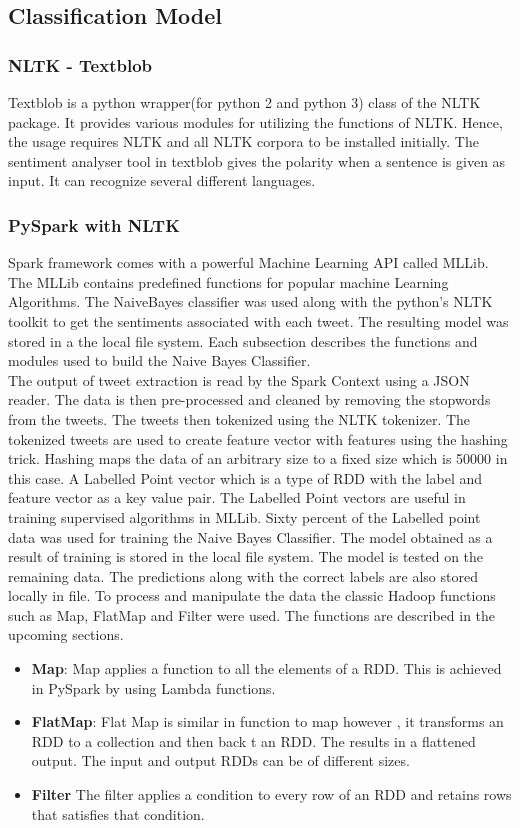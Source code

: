 \documentclass[9pt,twocolumn,twoside]{styles/osajnl}
\begin{document}
\subsection{Classification Model}
\subsubsection{NLTK - Textblob}
Textblob is a python wrapper(for python 2 and python 3) class of the NLTK package. It provides various modules for utilizing the functions of NLTK. Hence, the usage requires NLTK and all NLTK corpora to be installed initially. The sentiment analyser tool in textblob gives the polarity when a sentence is given as input. It can recognize several different languages. 
\subsubsection{PySpark with NLTK}
Spark framework comes with a powerful Machine Learning API called MLLib. The MLLib contains predefined functions for popular machine Learning Algorithms. The NaiveBayes classifier was used along with the python's NLTK toolkit to get the sentiments associated with each tweet. The resulting model was stored in a the local file system.  Each subsection describes the functions and modules used to build the Naive Bayes Classifier.\\
The output of tweet extraction is read by the Spark Context using a JSON reader. The data is then pre-processed and cleaned by removing the stopwords from the tweets. The tweets then  tokenized using the NLTK tokenizer. The tokenized tweets are used to create feature vector with  features using the hashing trick. Hashing maps the data of an arbitrary size to a fixed size which is 50000 in this case. A Labelled Point vector which is a type of RDD with the label and feature vector as a key value pair. The Labelled Point vectors are useful in training supervised algorithms in MLLib. Sixty percent of the Labelled point data was used for training the Naive Bayes Classifier. The model obtained as a result of training is stored in the local file system. The model is tested on the remaining data. The predictions along with the correct labels are also stored locally in file. To process and manipulate the data the classic Hadoop functions such as Map, FlatMap and Filter were used. The functions are described in the upcoming sections.
\begin{itemize}
    \item \textbf{Map}: Map applies a function to all the elements of a RDD. This is achieved in PySpark by using Lambda functions. 
    \item \textbf{FlatMap}: Flat Map is similar in function to map however  , it transforms an RDD to a collection and then back t an RDD. The results in a flattened output. The input and output RDDs can be of different sizes. 
    \item \textbf{Filter} The filter applies a condition to every row of an RDD and retains rows that satisfies that condition.
\end{itemize}
\end{document}
